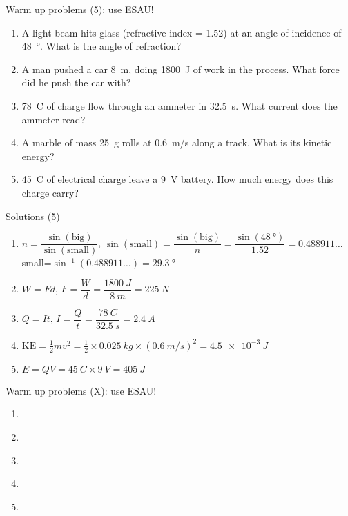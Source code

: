 \documentclass[14pt]{beamer}
\begin{document}
\begin{frame}{Warm up problems (5): use ESAU!}
\vspace*{-0.8em}\begin{enumerate}
\item\label{15.3} A light beam hits glass (refractive index = 1.52) at an angle of incidence of \SI{48}{\degree}.  What is the angle of refraction?
\item\label{5.2} A man pushed a car \SI{8}{m}, doing \SI{1800}{J} of work in the process.  What force did he push the car with?
\item\label{10.2} \SI{78}{C} of charge flow through an ammeter in \SI{32.5}{s}.  What current does the ammeter read?
\item\label{6.1} A marble of mass \SI{25}{g} rolls at \SI{0.6}{m/s} along a track.  What is its kinetic energy?
\item\label{13.1} \SI{45}{C} of electrical charge leave a \SI{9}{V} battery.  How much energy does this charge carry?
\end{enumerate}
\end{frame}

\begin{frame}{Solutions (5)}
\vspace*{-0.8em}\begin{enumerate}
\item\label{15.3} $n=\dfrac{\sin(\text{big})}{\sin(\text{small})}$, $\sin(\text{small})=\dfrac{\sin(\text{big})}{n}=\dfrac{\sin(\SI{48}{\degree})}{1.52}=0.488911\ldots$\\
small=$\sin^{-1}(0.488911\ldots)=\SI{29.3}{\degree}$
\item\label{5.2} $W=Fd$, $F=\dfrac{W}{d}=\dfrac{\SI{1800}{J}}{\SI{8}{m}}=\SI{225}{N}$
\item\label{10.2} $Q=It$, $I=\dfrac{Q}{t}=\dfrac{\SI{78}{C}}{\SI{32.5}{s}}=\SI{2.4}{A}$
\item\label{6.1} $\text{KE}=\frac{1}{2}mv^{2}=\frac{1}{2}\times\SI{0.025}{kg}\times(\SI{0.6}{m/s})^2=\SI{4.5e-3}{J}$
\item\label{13.1} $E=QV=\SI{45}{C}\times\SI{9}{V}=\SI{405}{J}$
\end{enumerate}
\end{frame}

\begin{frame}{Warm up problems (X): use ESAU!}
\vspace*{-0.8em}\begin{enumerate}
\item\label{X} 
\item\label{X} 
\item\label{X} 
\item\label{X} 
\item\label{X} 
\end{enumerate}
\end{frame}
\end{document}
